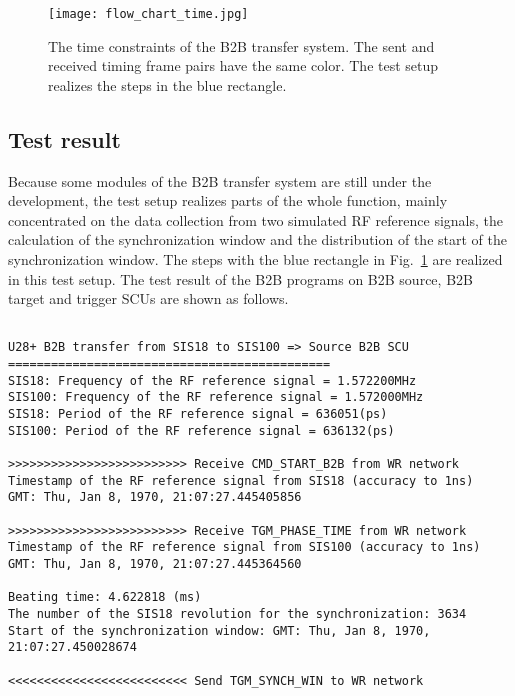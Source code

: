\begin{landscape}
\begin{figure}[!htb]
   \centering   
   \texttt{[image: flow\_chart\_time.jpg]}
   \caption{The time constraints of the B2B transfer system. The sent and received timing frame pairs have the same color. The test setup realizes the steps in the blue rectangle.}
   \label{time_constraint}
\end{figure}
\end{landscape}

\subsection{Test result}
Because some modules of the B2B transfer system are still under the development, the test setup realizes parts of the whole function, mainly concentrated on the data collection from two simulated RF reference signals, the calculation of the synchronization window and the distribution of the start of the synchronization window. The steps with the blue rectangle in Fig.~\ref{time_constraint} are realized in this test setup. The test result of the B2B programs on B2B source, B2B target and trigger SCUs are shown as follows. 

\begin{lstlisting}[language={[ANSI]C}, keywordstyle=\color{blue!70}, commentstyle=\color{red!50!green!50!blue!50}, frame=shadowbox, rulesepcolor=\color{red!20!green!20!blue!20}]

U28+ B2B transfer from SIS18 to SIS100 => Source B2B SCU
=============================================
SIS18: Frequency of the RF reference signal = 1.572200MHz
SIS100: Frequency of the RF reference signal = 1.572000MHz 
SIS18: Period of the RF reference signal = 636051(ps)
SIS100: Period of the RF reference signal = 636132(ps)

>>>>>>>>>>>>>>>>>>>>>>>>> Receive CMD_START_B2B from WR network
Timestamp of the RF reference signal from SIS18 (accuracy to 1ns)
GMT: Thu, Jan 8, 1970, 21:07:27.445405856

>>>>>>>>>>>>>>>>>>>>>>>>> Receive TGM_PHASE_TIME from WR network
Timestamp of the RF reference signal from SIS100 (accuracy to 1ns)
GMT: Thu, Jan 8, 1970, 21:07:27.445364560

Beating time: 4.622818 (ms)
The number of the SIS18 revolution for the synchronization: 3634
Start of the synchronization window: GMT: Thu, Jan 8, 1970, 21:07:27.450028674

<<<<<<<<<<<<<<<<<<<<<<<<< Send TGM_SYNCH_WIN to WR network
\end{lstlisting}

